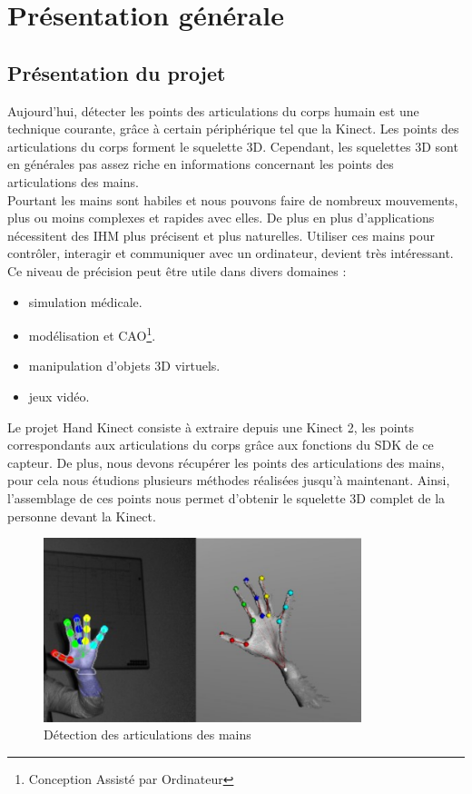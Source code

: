 \chapter{Présentation générale}



\section{Présentation du projet}
Aujourd'hui, détecter les points des articulations du corps humain 
est une technique courante, grâce à certain périphérique tel que la 
Kinect. Les points des articulations du corps forment le squelette 3D. 
Cependant, les squelettes 3D sont en générales pas assez riche en informations 
concernant les points des articulations des mains.\\

Pourtant les mains sont habiles et nous pouvons faire de nombreux 
mouvements, plus ou moins complexes et rapides avec elles. De plus en 
plus d'applications nécessitent des IHM plus précisent et plus 
naturelles. Utiliser ces mains pour contrôler, interagir et communiquer 
avec un ordinateur, devient très intéressant. Ce niveau de 
précision peut être utile dans divers domaines :
\begin{itemize}
  \item simulation médicale.
  \item modélisation et CAO\footnote{Conception Assisté par Ordinateur}.
  \item manipulation d'objets 3D virtuels.
  \item jeux vidéo.\\
\end{itemize}

Le projet \og Hand Kinect \fg consiste à extraire depuis une Kinect 2, 
les points correspondants aux articulations du corps grâce aux 
fonctions du SDK de ce capteur. De plus, nous devons récupérer les points 
des articulations des mains, pour cela nous étudions plusieurs méthodes réalisées
jusqu'à maintenant. Ainsi, l'assemblage de ces points nous permet 
d'obtenir le squelette 3D complet de la personne devant la Kinect.\\

\begin{figure}[H]
  \begin{center}
    \includegraphics[width=350px]{images/joint_detection.png}
    \caption{Détection des articulations des mains}
  \end{center}
\end{figure}

